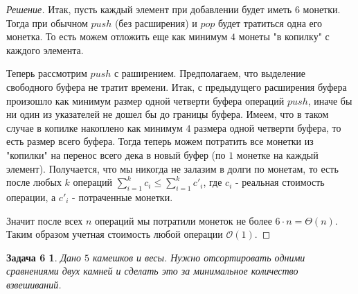 \documentclass[12pt]{article}
\newenvironment{solution}{\begin{proof}[Решение]}{\end{proof}}
\newtheorem*{task_6}{Задача 6}
\begin{document}
\begin{solution}
	Итак, пусть каждый элемент при добавлении будет иметь $6$ монетки.
	Тогда при обычном $push$ (без расширения) и $pop$ будет тратиться
	одна его монетка. То есть можем отложить еще как минимум $4$ 
	монеты "в копилку" с каждого элемента. 

	Теперь рассмотрим $push$ с раширением. Предполагаем, что выделение
	свободного буфера не тратит времени. Итак, с предыдущего 
	расширения буфера произошло как минимум размер одной четверти буфера
	операций $push$, иначе бы ни один из указателей не дошел бы до
	границы буфера. Имеем, что в таком случае в копилке накоплено
	как минимум $4$ размера одной четверти буфера, то есть размер
	всего буфера. Тогда теперь можем потратить все монетки из 
	"копилки" на перенос всего дека в новый буфер (по $1$ монетке
	на каждый элемент). Получается, что мы никогда не залазим в долги
	по монетам, то есть после любых $k$ операций $\sum_{i = 1}^{k}
	c_i \leq \sum_{i = 1}^{k} c'_i$, где $c_i$ - реальная стоимость
	операции, а $c'_i$ - потраченные монетки.

	Значит после всех $n$ операций мы потратили монеток
	не более $6\cdot n = 
	\Theta(n)$. Таким образом учетная стоимость любой операции 
	$\mathcal{O}(1)$.

\end{solution}

\begin{task_6}

	Дано $5$ камешков и весы. Нужно отсортировать одними сравнениями 
	двух камней и сделать это за минимальное количество взвешиваний.

\end{task_6}
\end{document}
